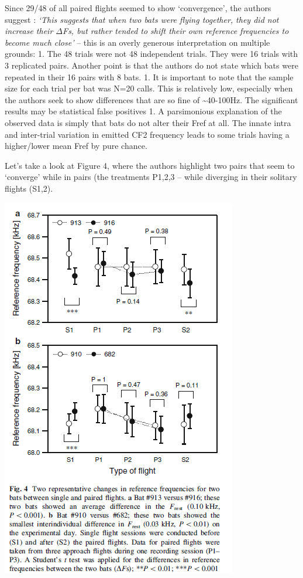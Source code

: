 \documentclass[
]{book}
\begin{document}
Since 29/48 of all paired flights seemed to show `convergence', the authors suggest : \emph{`This suggests that when two bats were flying together, they did not increase their \(\Delta\)Fs, but rather tended to shift their own reference frequencies to become much close'} -- this is an overly generous interpretation on multiple grounds:
1. The 48 trials were not 48 independent trials. They were 16 trials with 3 replicated pairs. Another point is that the authors do not state which bats were repeated in their 16 pairs with 8 bats.
1. It is important to note that the sample size for each trial per bat was N=20 calls. This is relatively low, especially when the authors seek to show differences that are so fine of \textasciitilde40-100Hz. The significant results may be statistical false positives
1. A parsimonious explanation of the observed data is simply that bats do not alter their Fref at all. The innate intra and inter-trial variation in emitted CF2 frequency leads to some trials having a higher/lower mean Fref by pure chance.

Let's take a look at Figure 4, where the authors highlight two pairs that seem to `converge' while in pairs (the treatments P1,2,3 -- while diverging in their solitary flights (S1,2).

\includegraphics{images/furusawa_etal2012_fig4.PNG}
\end{document}
